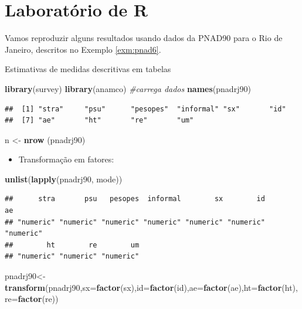 \documentclass[]{book}
\newenvironment{Shaded}{\begin{snugshade}}{\end{snugshade}}
\newcommand{\KeywordTok}[1]{\textcolor[rgb]{0.13,0.29,0.53}{\textbf{#1}}}
\newcommand{\DataTypeTok}[1]{\textcolor[rgb]{0.13,0.29,0.53}{#1}}
\newcommand{\StringTok}[1]{\textcolor[rgb]{0.31,0.60,0.02}{#1}}
\newcommand{\CommentTok}[1]{\textcolor[rgb]{0.56,0.35,0.01}{\textit{#1}}}
\newcommand{\NormalTok}[1]{#1}
\providecommand{\tightlist}{%
  \setlength{\itemsep}{0pt}\setlength{\parskip}{0pt}}
\theoremstyle{definition}
\theoremstyle{definition}
\theoremstyle{definition}
\theoremstyle{remark}
\let\BeginKnitrBlock\begin \let\EndKnitrBlock\end
\begin{document}
\section{Laboratório de R}\label{laboratorio-de-r-5}

Vamos reproduzir alguns resultados usando dados da PNAD90 para o Rio de
Janeiro, descritos no Exemplo \ref{exm:pnad6}.

\BeginKnitrBlock{example}
\protect\hypertarget{exm:exe82}{}{\label{exm:exe82} }Estimativas de medidas
descritivas em tabelas
\EndKnitrBlock{example}

\begin{Shaded}
\begin{Highlighting}[]
\KeywordTok{library}\NormalTok{(survey)}
\KeywordTok{library}\NormalTok{(anamco) }\CommentTok{#carrega dados}
\KeywordTok{names}\NormalTok{(pnadrj90)}
\end{Highlighting}
\end{Shaded}

\begin{verbatim}
##  [1] "stra"     "psu"      "pesopes"  "informal" "sx"       "id"      
##  [7] "ae"       "ht"       "re"       "um"
\end{verbatim}

\begin{Shaded}
\begin{Highlighting}[]
\NormalTok{n <-}\StringTok{ }\KeywordTok{nrow}\NormalTok{ (pnadrj90)}
\end{Highlighting}
\end{Shaded}

\begin{itemize}
\tightlist
\item
  Transformação em fatores:
\end{itemize}

\begin{Shaded}
\begin{Highlighting}[]
\KeywordTok{unlist}\NormalTok{(}\KeywordTok{lapply}\NormalTok{(pnadrj90, mode))}
\end{Highlighting}
\end{Shaded}

\begin{verbatim}
##      stra       psu   pesopes  informal        sx        id        ae 
## "numeric" "numeric" "numeric" "numeric" "numeric" "numeric" "numeric" 
##        ht        re        um 
## "numeric" "numeric" "numeric"
\end{verbatim}

\begin{Shaded}
\begin{Highlighting}[]
\NormalTok{pnadrj90<-}\KeywordTok{transform}\NormalTok{(pnadrj90,}\DataTypeTok{sx=}\KeywordTok{factor}\NormalTok{(sx),}\DataTypeTok{id=}\KeywordTok{factor}\NormalTok{(id),}\DataTypeTok{ae=}\KeywordTok{factor}\NormalTok{(ae),}\DataTypeTok{ht=}\KeywordTok{factor}\NormalTok{(ht),}\DataTypeTok{re=}\KeywordTok{factor}\NormalTok{(re))}
\end{Highlighting}
\end{Shaded}
\end{document}
